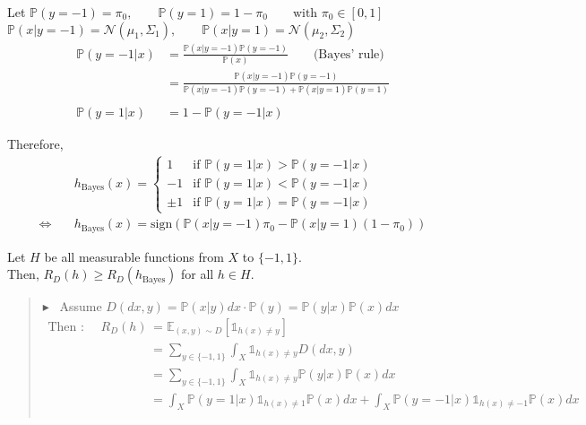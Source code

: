 \documentclass[12pt,a4paper]{article}
\newcommand{\theoreme}[2]{%
    \begin{tcolorbox}[colback=white,colframe=red!25!white,title=\textbf{Théorème #1}, coltitle=black]
        #2
    \end{tcolorbox}
}
\newcommand{\preuve}[1]{%
    \begin{quote}
        $\blacktriangleright$~#1
    \end{quote}
}
\begin{document}
Let $\mathbb{P}(y = -1) = \pi_0, \qquad 
\mathbb{P}(y = 1) = 1 - \pi_0 \qquad \text{with } \pi_0 \in [0, 1]$\\
$\mathbb{P}(x|y = -1) = \mathcal{N}(\mu_1, \Sigma_1), \qquad 
\mathbb{P}(x|y = 1) = \mathcal{N}(\mu_2, \Sigma_2)$\\

\begin{align*}
    \mathbb{P}(y = -1 | x) &= \frac{\mathbb{P}(x | y = -1)\mathbb{P}(y = -1)}{\mathbb{P}(x)} \qquad \text{(Bayes' rule)} \\
    &= \frac{\mathbb{P}(x | y = -1)\mathbb{P}(y = -1)}{\mathbb{P}(x | y = -1)\mathbb{P}(y = -1) + \mathbb{P}(x | y = 1)\mathbb{P}(y = 1)} \\
    & \\
    \mathbb{P}(y = 1 | x) &= 1 - \mathbb{P}(y = -1 | x)
\end{align*}

Therefore,
\begin{align*}
    & h_{\text{Bayes}} (x) = \begin{cases}
        1 & \text{if } \mathbb{P}(y = 1 | x) > \mathbb{P}(y = -1 | x) \\
        -1 & \text{if } \mathbb{P}(y = 1 | x) < \mathbb{P}(y = -1 | x) \\
        \pm 1 & \text{if } \mathbb{P}(y = 1 | x) = \mathbb{P}(y = -1 | x)
    \end{cases}\\
    \Leftrightarrow \quad & h_{\text{Bayes}} (x) = \text{sign}(\mathbb{P}(x | y = -1) \pi_0 - \mathbb{P}(x | y = 1)(1 - \pi_0))
\end{align*}



\theoreme{}{
    Let $H$ be all measurable functions from $X$ to $\{-1, 1\}$. \\
    Then, $R_D(h) \geq R_D(h_{\text{Bayes}})$ for all $h \in H$.
}

\preuve{
    Assume $D(dx, y) = \mathbb{P}(x | y)dx \cdot \mathbb{P}(y) = \mathbb{P}(y | x)\mathbb{P}(x)dx$
    \begin{align*}
        \text{Then : } \quad R_D(h) &= \mathbb{E}_{(x, y) \sim D} [\mathds{1}_{h(x) \neq y}] \\
        &= \sum_{y \in \{-1, 1\}} \int_X \mathds{1}_{h(x) \neq y} D(dx, y) \\
        &= \sum_{y \in \{-1, 1\}} \int_X \mathds{1}_{h(x) \neq y} \mathbb{P}(y | x)\mathbb{P}(x)dx \\
        &= \int_X \mathbb{P}(y = 1 | x) \mathds{1}_{h(x) \neq 1} \mathbb{P}(x)dx + \int_X \mathbb{P}(y = -1 | x) \mathds{1}_{h(x) \neq -1} \mathbb{P}(x)dx \\
    \end{align*}
}
\end{document}
